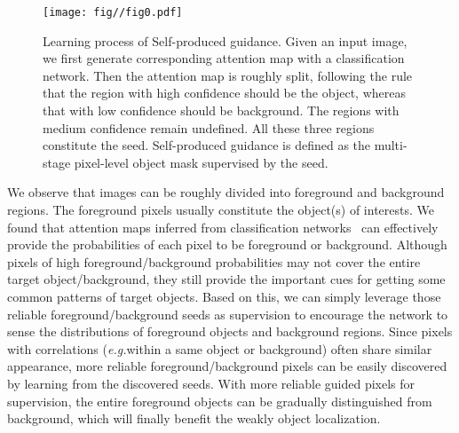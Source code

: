 \documentclass[runningheads]{llncs}
\newcommand{\eg}{\emph{e.g.}}
\begin{document}
\begin{figure*}[t]
  \centering
  \texttt{[image: fig//fig0.pdf]}
  \caption{Learning process of Self-produced guidance. Given an input image,
  we first generate corresponding attention map with a classification network.
  Then the attention map is roughly split,
  following the rule that the region with high confidence should be the object,
  whereas that with low confidence should be background.
  The regions with medium confidence remain undefined.
  All these three regions constitute the seed.
  Self-produced guidance is defined as the multi-stage pixel-level object mask supervised by the seed.
  }
  \label{fig-0}
\end{figure*}
We observe that images can be roughly divided into foreground and background regions. 
The foreground pixels usually constitute the object(s) of interests. 
We found that attention maps inferred from classification networks~\cite{zhu2014learning,wei2017object,zhang2018adversarial} can effectively provide the probabilities of each pixel to be foreground or background. 
Although pixels of high foreground/background probabilities may not cover the entire target object/background, they still provide the important cues for getting some common patterns of target objects. 
Based on this, we can simply leverage those reliable foreground/background seeds as supervision to encourage the network to sense the distributions of foreground objects and background regions.
Since pixels with correlations (\eg within a same object or background) often share similar appearance, more reliable foreground/background pixels can be easily discovered by learning from the discovered seeds. 
With more reliable guided pixels for supervision, the entire foreground objects can be gradually distinguished from background, which will finally benefit the weakly object localization.
\end{document}
